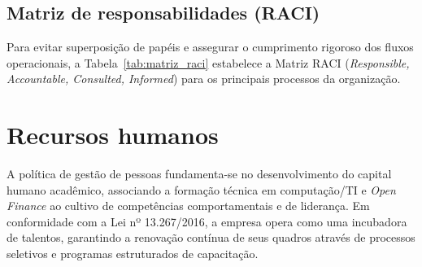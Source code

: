 \documentclass[
  12pt,
  openright,
  oneside,
  a4paper,
  brazilian
]{abntex2}
\begin{document}
\section{Matriz de responsabilidades (RACI)}
\label{sec:matriz_raci}

Para evitar superposição de papéis e assegurar o cumprimento rigoroso dos fluxos operacionais, a Tabela~\ref{tab:matriz_raci} estabelece a Matriz RACI (\textit{Responsible, Accountable, Consulted, Informed}) para os principais processos da organização.

\begin{table}[htbp]
\centering
\caption{Matriz de responsabilidade RACI para processos da Jataí.}
\label{tab:matriz_raci}
\end{table}


\chapter{Recursos humanos}
\label{cap:recursos_humanos}

A política de gestão de pessoas fundamenta-se no desenvolvimento do capital humano acadêmico, associando a formação técnica em computação/TI e \textit{Open Finance} ao cultivo de competências comportamentais e de liderança. Em conformidade com a Lei nº 13.267/2016, a empresa opera como uma incubadora de talentos, garantindo a renovação contínua de seus quadros através de processos seletivos e programas estruturados de capacitação.
\end{document}
